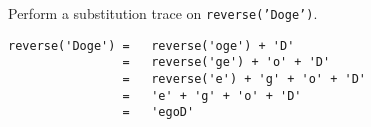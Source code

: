 Perform a substitution trace on \texttt{reverse('Doge')}.

\begin{answer}
\begin{lstlisting}[numbers=none]
reverse('Doge')	=	reverse('oge') + 'D'
				=	reverse('ge') + 'o' + 'D'
				=	reverse('e') + 'g' + 'o' + 'D'
				=	'e' + 'g' + 'o' + 'D'
				=	'egoD'
\end{lstlisting}
\end{answer}